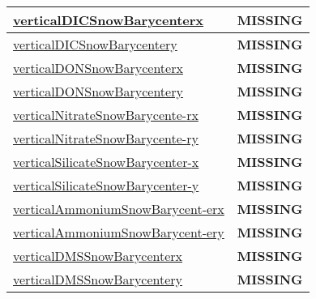 {\begin{center}
\begin{longtable}{| p{2.0in} | p{4.0in} |}
    \hline
    \hyperref[subsec:var_sec_tracer_barycenter_verticalDICSnowBarycenterx]{verticalDICSnowBarycenterx} & {\bf \color{red} MISSING} \\
    \hline
    \hyperref[subsec:var_sec_tracer_barycenter_verticalDICSnowBarycentery]{verticalDICSnowBarycentery} & {\bf \color{red} MISSING} \\
    \hline
    \hyperref[subsec:var_sec_tracer_barycenter_verticalDONSnowBarycenterx]{verticalDONSnowBarycenterx} & {\bf \color{red} MISSING} \\
    \hline
    \hyperref[subsec:var_sec_tracer_barycenter_verticalDONSnowBarycentery]{verticalDONSnowBarycentery} & {\bf \color{red} MISSING} \\
    \hline
    \hyperref[subsec:var_sec_tracer_barycenter_verticalNitrateSnowBarycenterx]{verticalNitrateSnowBarycente-}\hyperref[subsec:var_sec_tracer_barycenter_verticalNitrateSnowBarycenterx]{rx  }& {\bf \color{red} MISSING} \\
    \hline
    \hyperref[subsec:var_sec_tracer_barycenter_verticalNitrateSnowBarycentery]{verticalNitrateSnowBarycente-}\hyperref[subsec:var_sec_tracer_barycenter_verticalNitrateSnowBarycentery]{ry  }& {\bf \color{red} MISSING} \\
    \hline
    \hyperref[subsec:var_sec_tracer_barycenter_verticalSilicateSnowBarycenterx]{verticalSilicateSnowBarycenter-}\hyperref[subsec:var_sec_tracer_barycenter_verticalSilicateSnowBarycenterx]{x  }& {\bf \color{red} MISSING} \\
    \hline
    \hyperref[subsec:var_sec_tracer_barycenter_verticalSilicateSnowBarycentery]{verticalSilicateSnowBarycenter-}\hyperref[subsec:var_sec_tracer_barycenter_verticalSilicateSnowBarycentery]{y  }& {\bf \color{red} MISSING} \\
    \hline
    \hyperref[subsec:var_sec_tracer_barycenter_verticalAmmoniumSnowBarycenterx]{verticalAmmoniumSnowBarycent-}\hyperref[subsec:var_sec_tracer_barycenter_verticalAmmoniumSnowBarycenterx]{erx  }& {\bf \color{red} MISSING} \\
    \hline
    \hyperref[subsec:var_sec_tracer_barycenter_verticalAmmoniumSnowBarycentery]{verticalAmmoniumSnowBarycent-}\hyperref[subsec:var_sec_tracer_barycenter_verticalAmmoniumSnowBarycentery]{ery  }& {\bf \color{red} MISSING} \\
    \hline
    \hyperref[subsec:var_sec_tracer_barycenter_verticalDMSSnowBarycenterx]{verticalDMSSnowBarycenterx} & {\bf \color{red} MISSING} \\
    \hline
    \hyperref[subsec:var_sec_tracer_barycenter_verticalDMSSnowBarycentery]{verticalDMSSnowBarycentery} & {\bf \color{red} MISSING} \\

\end{longtable}
\end{center}}
